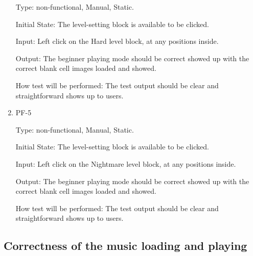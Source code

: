 \documentclass[12pt, titlepage]{article}
\begin{document}
\begin{enumerate}
Type: non-functional, Manual, Static.
					
Initial State: The level-setting block is available to be clicked.
					
Input: Left click on the Hard level block, at any positions inside.
					
Output: The beginner playing mode should be correct showed up with the correct blank cell images loaded and showed.
					
How test will be performed: The test output should be clear and straightforward shows up to users. 

\item{PF-5\\}

Type: non-functional, Manual, Static.
					
Initial State: The level-setting block is available to be clicked.
					
Input: Left click on the Nightmare level block, at any positions inside.
					
Output: The beginner playing mode should be correct showed up with the correct blank cell images loaded and showed.
					
How test will be performed: The test output should be clear and straightforward shows up to users. 
\end{enumerate}
\subsection{Correctness of the music loading and playing}
		
\end{document}
